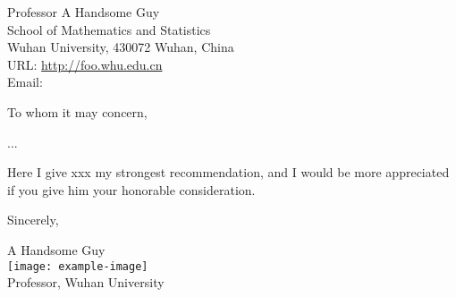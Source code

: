\documentclass{WHU-Recommendation-Letter}
\begin{document}
\begin{info}
  Professor A Handsome Guy \\
  School of Mathematics and Statistics \\
  Wuhan University, 430072 Wuhan, China \\
  URL: \url{http://foo.whu.edu.cn} \\
  Email:   \\
\end{info}




To whom it may concern,

...

Here I give xxx my strongest recommendation, and I would be more appreciated if you give him your honorable consideration.

Sincerely,


\begin{signature}[direction = left]
  A Handsome Guy \\
  \texttt{[image: example-image]} \\
  Professor, Wuhan University
\end{signature}
\end{document}
